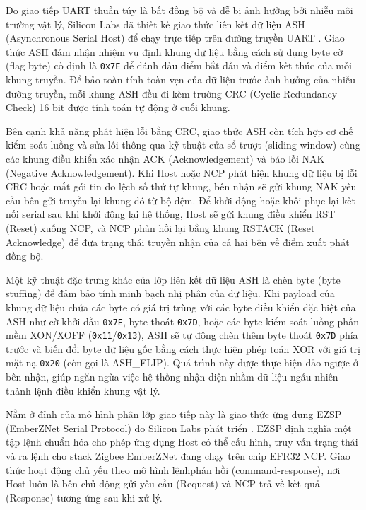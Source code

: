 Do giao tiếp UART thuần túy là bất đồng bộ và dễ bị ảnh hưởng bởi nhiễu môi trường vật lý, Silicon Labs đã thiết kế giao thức liên kết dữ liệu ASH (Asynchronous Serial Host) để chạy trực tiếp trên đường truyền UART \cite{silabs-ezsp,silabs-z3gateway}. Giao thức ASH đảm nhận nhiệm vụ định khung dữ liệu bằng cách sử dụng byte cờ (flag byte) cố định là \texttt{0x7E} để đánh dấu điểm bắt đầu và điểm kết thúc của mỗi khung truyền. Để bảo toàn tính toàn vẹn của dữ liệu trước ảnh hưởng của nhiễu đường truyền, mỗi khung ASH đều đi kèm trường CRC (Cyclic Redundancy Check) 16 bit được tính toán tự động ở cuối khung.


Bên cạnh khả năng phát hiện lỗi bằng CRC, giao thức ASH còn tích hợp cơ chế kiểm soát luồng và sửa lỗi thông qua kỹ thuật cửa sổ trượt (sliding window) cùng các khung điều khiển xác nhận ACK (Acknowledgement) và báo lỗi NAK (Negative Acknowledgement). Khi Host hoặc NCP phát hiện khung dữ liệu bị lỗi CRC hoặc mất gói tin do lệch số thứ tự khung, bên nhận sẽ gửi khung NAK yêu cầu bên gửi truyền lại khung đó từ bộ đệm. Để khởi động hoặc khôi phục lại kết nối serial sau khi khởi động lại hệ thống, Host sẽ gửi khung điều khiển RST (Reset) xuống NCP, và NCP phản hồi lại bằng khung RSTACK (Reset Acknowledge) để đưa trạng thái truyền nhận của cả hai bên về điểm xuất phát đồng bộ.

Một kỹ thuật đặc trưng khác của lớp liên kết dữ liệu ASH là chèn byte (byte stuffing) để đảm bảo tính minh bạch nhị phân của dữ liệu. Khi payload của khung dữ liệu chứa các byte có giá trị trùng với các byte điều khiển đặc biệt của ASH như cờ khởi đầu \texttt{0x7E}, byte thoát \texttt{0x7D}, hoặc các byte kiểm soát luồng phần mềm XON/XOFF (\texttt{0x11}/\texttt{0x13}), ASH sẽ tự động chèn thêm byte thoát \texttt{0x7D} phía trước và biến đổi byte dữ liệu gốc bằng cách thực hiện phép toán XOR với giá trị mặt nạ \texttt{0x20} (còn gọi là ASH\_FLIP). Quá trình này được thực hiện đảo ngược ở bên nhận, giúp ngăn ngừa việc hệ thống nhận diện nhầm dữ liệu ngẫu nhiên thành lệnh điều khiển khung vật lý.

Nằm ở đỉnh của mô hình phân lớp giao tiếp này là giao thức ứng dụng EZSP (EmberZNet Serial Protocol) do Silicon Labs phát triển \cite{silabs-ezsp}. EZSP định nghĩa một tập lệnh chuẩn hóa cho phép ứng dụng Host có thể cấu hình, truy vấn trạng thái và ra lệnh cho stack Zigbee EmberZNet đang chạy trên chip EFR32 NCP. Giao thức hoạt động chủ yếu theo mô hình lệnh\textendash{}phản hồi (command-response), nơi Host luôn là bên chủ động gửi yêu cầu (Request) và NCP trả về kết quả (Response) tương ứng sau khi xử lý.

